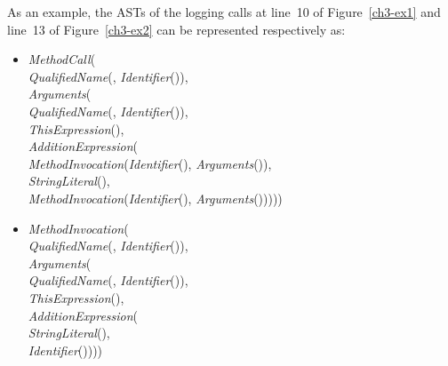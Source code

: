 As an example, the ASTs of the logging calls at line~10 of Figure~\ref{ch3-ex1} and line~13 of Figure~\ref{ch3-ex2} can be represented respectively as:
\begin{itemize} [leftmargin=0.7in]
\item \textit{MethodCall}(\\
\hspace*{1em}\textit{QualifiedName}(, \textit{Identifier}()),\\
\hspace*{1em}\textit{Arguments}(\\
\hspace*{2em}\textit{QualifiedName}(, \mbox{\textit{Identifier}()}),\\
\hspace*{2em}\textit{ThisExpression}(),\\
\hspace*{2em}\textit{AdditionExpression}(\\
\hspace*{3em}\textit{MethodInvocation}(\textit{Identifier}(), \textit{Arguments}()),\\
\hspace*{3em}\textit{StringLiteral}(),\\
\hspace*{3em}\textit{MethodInvocation}(\textit{Identifier}(), \textit{Arguments}()))))\\
\item \textit{MethodInvocation}(\\
\hspace*{1em}\textit{QualifiedName}(, \textit{Identifier}()),\\
\hspace*{1em}\textit{Arguments}(\\
\hspace*{2em}\textit{QualifiedName}(, \mbox{\textit{Identifier}()}),\\
\hspace*{2em}\textit{ThisExpression}(),\\
\hspace*{2em}\textit{AdditionExpression}(\\
\hspace*{3em}\textit{StringLiteral}(),\\
\hspace*{3em}\textit{Identifier}())))\\
\end{itemize}

